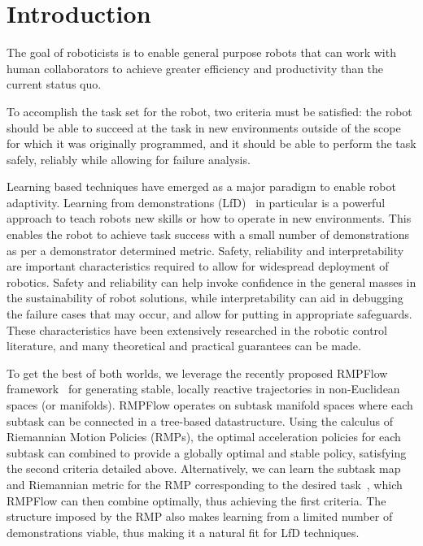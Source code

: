 \section{Introduction}

The goal of roboticists is to enable general purpose robots that can work with human collaborators to achieve greater efficiency and productivity than the current status quo.

To accomplish the task set for the robot, two criteria must be satisfied: the robot should be able to succeed at the task in new environments outside of the scope for which it was originally programmed, and it should be able to perform the task safely, reliably while allowing for failure analysis.

Learning based techniques have emerged as a major paradigm to enable robot adaptivity. Learning from demonstrations (LfD)~\cite{Argall09ras} in particular is a powerful approach to teach robots new skills or how to operate in new environments. This enables the robot to achieve task success with a small number of demonstrations as per a demonstrator determined metric.
Safety, reliability and interpretability are important characteristics required to allow for widespread deployment of robotics. Safety and reliability can help invoke confidence in the general masses in the sustainability of robot solutions, while interpretability can aid in debugging the failure cases that may occur, and allow for putting in appropriate safeguards. These characteristics have been extensively researched in the robotic control literature, and many theoretical and practical guarantees can be made.

To get the best of both worlds, we leverage the recently proposed RMPFlow framework~\cite{Cheng21tase} for generating stable, locally reactive trajectories in non-Euclidean spaces (or manifolds). RMPFlow operates on subtask manifold spaces where each subtask can be connected in a tree-based datastructure. Using the calculus of Riemannian Motion Policies (RMPs), the optimal acceleration policies for each subtask can combined to provide a globally optimal and stable policy, satisfying the second criteria detailed above. Alternatively, we can learn the subtask map and Riemannian metric for the RMP corresponding to the desired task~\cite{Rana20corl,Rana20ldc}, which RMPFlow can then combine optimally, thus achieving the first criteria. The structure imposed by the RMP also makes learning from a limited number of demonstrations viable, thus making it a natural fit for LfD techniques.

